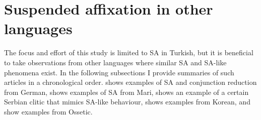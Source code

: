 














\section{Suspended affixation in other languages}

The focus and effort of this study is limited to SA in Turkish, but it is beneficial to take observations from other languages where similar SA and SA-like phenomena exist. In the following subsections I provide summaries of such articles in a chronological order. \cite{pounder2006broken} shows examples of SA and conjunction reduction from German, \cite{guseva2017postsyntactic} shows examples of SA from Mari, \cite{despic2017suspended} shows an example of a certain Serbian clitic that mimics SA-like behaviour, \cite{yoon2017lexical} shows examples from Korean, and \cite{erschler2012suspended,erschler2018suspended} show examples from Ossetic.













